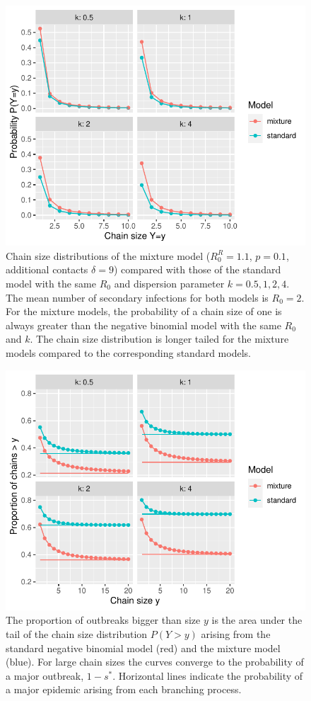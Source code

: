 \documentclass{imammb}
\numberwithin{equation}{section}
\begin{document}
\begin{figure}
    \centering
    \includegraphics{Figure2.pdf}
    \caption{Chain size distributions of the mixture model ($R_0^R=1.1$, $p=0.1$, additional contacts $\delta =9$) compared with those of the standard model with the same $R_0$ and dispersion parameter $k=0.5, 1, 2, 4$. The mean number of secondary infections for both models is $R_0 =2$. For the mixture models, the probability of a chain size of one is always greater than the negative binomial model with the same $R_0$ and $k$.  The chain size distribution is longer tailed for the mixture models compared to the corresponding standard models. }
    \label{fig:chains}
\end{figure}

\begin{figure}
    \centering
    \includegraphics{Figure3.pdf}
    \caption{The proportion of outbreaks bigger than size $y$ is the area under the tail of the chain size distribution $P(Y>y)$ arising from the standard negative binomial model (red) and the mixture model (blue). For large chain sizes the curves converge to the probability of a major outbreak, $1-s^*$. Horizontal lines indicate the probability of a major epidemic arising from each branching process.}
    \label{fig:compcdf}
\end{figure}
\end{document}
